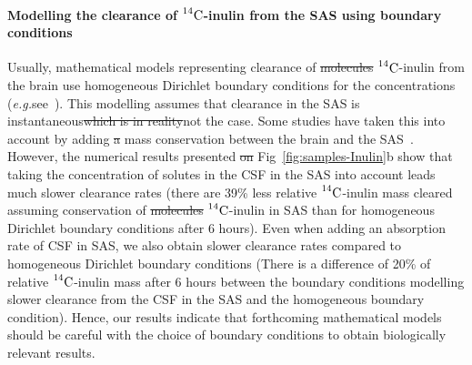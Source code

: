 \documentclass[a4paper,11pt]{article} %
\newcommand{\eg}{\emph{e.g.}\;}
\newcommand{\1}{^{(1)}}
\newcommand{\2}{^{(2)}}
\newcommand{\Cinulin}{$\prescript{14}{}{\text{C}}$-inulin }
\providecommand{\DIFaddtex}[1]{{\protect\color{blue}\uwave{#1}}} %
\providecommand{\DIFdeltex}[1]{{\protect\color{red}\sout{#1}}}                      %
\providecommand{\DIFaddbegin}{} %
\providecommand{\DIFaddend}{} %
\providecommand{\DIFdelbegin}{} %
\providecommand{\DIFdelend}{} %
\providecommand{\DIFadd}[1]{\texorpdfstring{\DIFaddtex{#1}}{#1}} %
\providecommand{\DIFdel}[1]{\texorpdfstring{\DIFdeltex{#1}}{}} %
\newcommand{\DIFscaledelfig}{0.5}
\newlength{\DIFdelgraphicswidth} %
\newlength{\DIFdelgraphicsheight} %
\newcommand{\DIFaddincludegraphics}[2][]{{\color{blue}\fbox{\DIFOincludegraphics[#1]{#2}}}} %
\newcommand{\DIFdelincludegraphics}[2][]{%
\sbox{\DIFdelgraphicsbox}{\DIFOincludegraphics[#1]{#2}}%
\settoboxwidth{\DIFdelgraphicswidth}{\DIFdelgraphicsbox} %
\settoboxtotalheight{\DIFdelgraphicsheight}{\DIFdelgraphicsbox} %
\scalebox{\DIFscaledelfig}{%
\parbox[b]{\DIFdelgraphicswidth}{\usebox{\DIFdelgraphicsbox}\\[-\baselineskip] \rule{\DIFdelgraphicswidth}{0em}}\llap{\resizebox{\DIFdelgraphicswidth}{\DIFdelgraphicsheight}{%
\setlength{\unitlength}{\DIFdelgraphicswidth}%
\begin{picture}(1,1)%
\thicklines\linethickness{2pt} %
{\color[rgb]{1,0,0}\put(0,0){\framebox(1,1){}}}%
{\color[rgb]{1,0,0}\put(0,0){\line( 1,1){1}}}%
{\color[rgb]{1,0,0}\put(0,1){\line(1,-1){1}}}%
\end{picture}%
}\hspace*{3pt}}} %
} %
\DeclareRobustCommand{\DIFaddbegin}{\DIFOaddbegin \let\includegraphics\DIFaddincludegraphics} %
\DeclareRobustCommand{\DIFaddend}{\DIFOaddend \let\includegraphics\DIFOincludegraphics} %
\DeclareRobustCommand{\DIFdelbegin}{\DIFOdelbegin \let\includegraphics\DIFdelincludegraphics} %
\DeclareRobustCommand{\DIFdelend}{\DIFOaddend \let\includegraphics\DIFOincludegraphics} %
\begin{document}
\paragraph{Modelling the clearance of \Cinulin from the SAS using boundary conditions}
Usually, mathematical models representing clearance of \DIFdelbegin \DIFdel{molecules }\DIFdelend \DIFaddbegin \Cinulin \DIFaddend from the brain use homogeneous Dirichlet boundary conditions for the concentrations (\eg see~\cite{Holter9894,stoverud_modeling_2012}). This modelling assumes that clearance in the SAS is instantaneous\DIFdelbegin \DIFdel{which is in reality}\DIFdelend \DIFaddbegin \DIFadd{, which in reality, is }\DIFaddend not the case. Some studies have taken this into account by adding \DIFdelbegin \DIFdel{a }\DIFdelend mass conservation between the brain and the SAS~\cite{croci2019uncertainty}.
However, the numerical results presented \DIFdelbegin \DIFdel{on }\DIFdelend \DIFaddbegin \DIFadd{in }\DIFaddend Fig~\ref{fig:samples-Inulin}b show that taking the concentration of solutes in the CSF in the SAS into account leads \DIFaddbegin \DIFadd{to }\DIFaddend much slower clearance rates (there are 39\% less relative \Cinulin mass cleared assuming conservation of \DIFdelbegin \DIFdel{molecules }\DIFdelend \DIFaddbegin \Cinulin \DIFaddend in SAS than for homogeneous Dirichlet boundary conditions after 6 hours). Even when adding an absorption rate of CSF in SAS, we also obtain slower clearance rates compared to homogeneous Dirichlet boundary conditions (There is a difference of 20\% of relative \Cinulin mass after 6 hours between the boundary conditions modelling slower clearance from the CSF in the SAS and the homogeneous boundary condition). Hence, our results indicate that forthcoming mathematical models should be careful with the choice of boundary conditions to obtain biologically relevant results.

\end{document}
